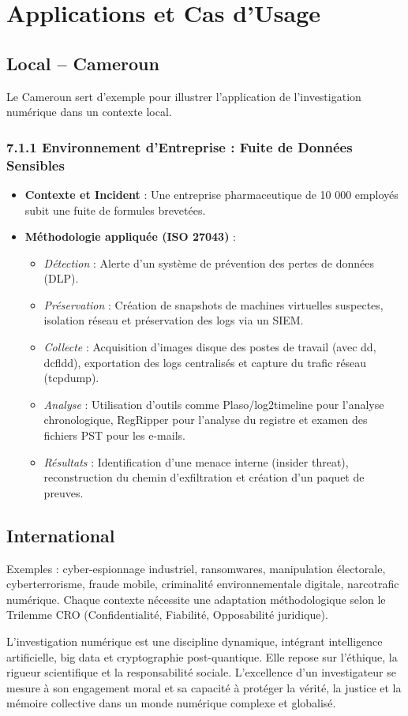 \documentclass[12pt]{article}
\begin{document}
\section{Applications et Cas d’Usage}
\subsection{Local – Cameroun}

Le Cameroun sert d'exemple pour illustrer l'application de l'investigation numérique dans un contexte local.

\subsubsection{7.1.1 Environnement d’Entreprise : Fuite de Données Sensibles}
\begin{itemize}[leftmargin=*]
    \item \textbf{Contexte et Incident} : Une entreprise pharmaceutique de 10 000 employés subit une fuite de formules brevetées.
    \item \textbf{Méthodologie appliquée (ISO 27043)} :
    \begin{itemize}[leftmargin=*]
        \item \textit{Détection} : Alerte d'un système de prévention des pertes de données (DLP).
        \item \textit{Préservation} : Création de snapshots de machines virtuelles suspectes, isolation réseau et préservation des logs via un SIEM.
        \item \textit{Collecte} : Acquisition d'images disque des postes de travail (avec dd, dcfldd), exportation des logs centralisés et capture du trafic réseau (tcpdump).
        \item \textit{Analyse} : Utilisation d'outils comme Plaso/log2timeline pour l'analyse chronologique, RegRipper pour l'analyse du registre et examen des fichiers PST pour les e-mails.
        \item \textit{Résultats} : Identification d'une menace interne (insider threat), reconstruction du chemin d'exfiltration et création d'un paquet de preuves.
    \end{itemize}
\end{itemize}

\subsection{International}
Exemples : cyber-espionnage industriel, ransomwares, manipulation électorale, cyberterrorisme, fraude mobile, criminalité environnementale digitale, narcotrafic numérique. Chaque contexte nécessite une adaptation méthodologique selon le Trilemme CRO (Confidentialité, Fiabilité, Opposabilité juridique).

L’investigation numérique est une discipline dynamique, intégrant intelligence artificielle, big data et cryptographie post-quantique. Elle repose sur l’éthique, la rigueur scientifique et la responsabilité sociale. L’excellence d’un investigateur se mesure à son engagement moral et sa capacité à protéger la vérité, la justice et la mémoire collective dans un monde numérique complexe et globalisé.
\end{document}
